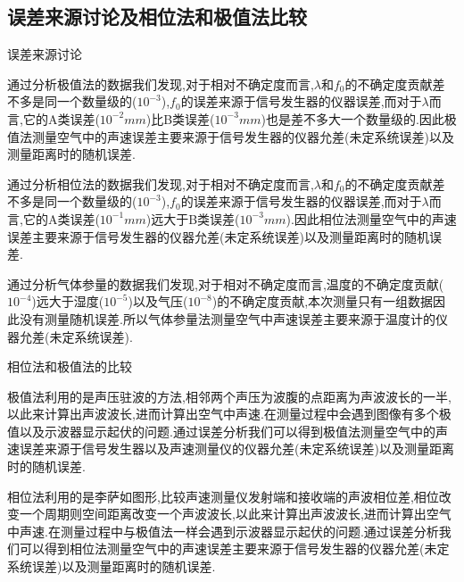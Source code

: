 \documentclass[a4 paper,12pt]{article}
\begin{document}
\subsection{误差来源讨论及相位法和极值法比较}
\begin{center}
	误差来源讨论
\end{center}
\par 通过分析极值法的数据我们发现,对于相对不确定度而言,$\lambda$和$f_{0}$的不确定度贡献差不多是同一个数量级的($10^{-3}$),$f_{0}$的误差来源于信号发生器的仪器误差,而对于$\lambda$而言,它的A类误差($10^{-2}mm$)比B类误差($10^{-3}mm$)也是差不多大一个数量级的.因此极值法测量空气中的声速误差主要来源于信号发生器的仪器允差(未定系统误差)以及测量距离时的随机误差.\\
\par 通过分析相位法的数据我们发现,对于相对不确定度而言,$\lambda$和$f_{0}$的不确定度贡献差不多是同一个数量级的($10^{-3}$),$f_{0}$的误差来源于信号发生器的仪器误差,而对于$\lambda$而言,它的A类误差($10^{-1}mm$)远大于B类误差($10^{-3}mm$).因此相位法测量空气中的声速误差主要来源于信号发生器的仪器允差(未定系统误差)以及测量距离时的随机误差.\\
\par 通过分析气体参量的数据我们发现,对于相对不确定度而言,温度的不确定度贡献($10^{-4}$)远大于湿度($10^{-5}$)以及气压($10^{-8}$)的不确定度贡献,本次测量只有一组数据因此没有测量随机误差.所以气体参量法测量空气中声速误差主要来源于温度计的仪器允差(未定系统误差).
\begin{center}
	相位法和极值法的比较
\end{center}
\par 极值法利用的是声压驻波的方法,相邻两个声压为波腹的点距离为声波波长的一半,以此来计算出声波波长,进而计算出空气中声速.在测量过程中会遇到图像有多个极值以及示波器显示起伏的问题.通过误差分析我们可以得到极值法测量空气中的声速误差来源于信号发生器以及声速测量仪的仪器允差(未定系统误差)以及测量距离时的随机误差.\\
\par 相位法利用的是李萨如图形,比较声速测量仪发射端和接收端的声波相位差,相位改变一个周期则空间距离改变一个声波波长,以此来计算出声波波长,进而计算出空气中声速.在测量过程中与极值法一样会遇到示波器显示起伏的问题.通过误差分析我们可以得到相位法测量空气中的声速误差主要来源于信号发生器的仪器允差(未定系统误差)以及测量距离时的随机误差.
\end{document}
